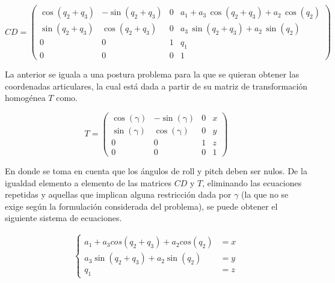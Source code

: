 \documentclass[a4paper,12pt]{article}
\begin{document}
\begin{equation}
    CD = \left(\begin{array}{cccc} \cos\left(q_{2}+q_{3}\right) & -\sin\left(q_{2}+q_{3}\right) & 0 & a_{1}+a_{3}\,\cos\left(q_{2}+q_{3}\right)+a_{2}\,\cos\left(q_{2}\right)\\ \sin\left(q_{2}+q_{3}\right) & \cos\left(q_{2}+q_{3}\right) & 0 & a_{3}\,\sin\left(q_{2}+q_{3}\right)+a_{2}\,\sin\left(q_{2}\right)\\ 0 & 0 & 1 & q_{1}\\ 0 & 0 & 0 & 1 \end{array}\right)
    \label{CD generica}
\end{equation}

La anterior se iguala a una postura problema para la que se quieran obtener las coordenadas articulares, la cual está dada a partir de su matriz de transformación homogénea $T$ como.

\begin{equation}
    T = \left(\begin{array}{cccc} \cos\left(\mathrm{\gamma}\right) & -\sin\left(\mathrm{\gamma}\right) & 0 & x\\ \sin\left(\mathrm{\gamma}\right) & \cos\left(\mathrm{\gamma}\right) & 0 & y\\ 0 & 0 & 1 & z\\ 0 & 0 & 0 & 1 \end{array}\right)
    \label{postura}
\end{equation}

En donde se toma en cuenta que los ángulos de roll y pitch deben ser nulos.
De la igualdad elemento a elemento de las matrices $CD$ y $T$, eliminando las ecuaciones repetidas y aquellas que implican alguna restricción dada por $\gamma$ (la que no se exige según la formulación considerada del problema), se puede obtener el siguiente sistema de ecuaciones.

\begin{align}
    \begin{cases}
        a_1 + a_3cos(q_2 + q_3) + a_2cos(q_2) &= x\\
        a_3\sin(q_2 + q_3) + a_2\sin(q_2) &= y\\
        q_1 &= z
    \end{cases}
    \label{postura}
\end{align}
\end{document}
